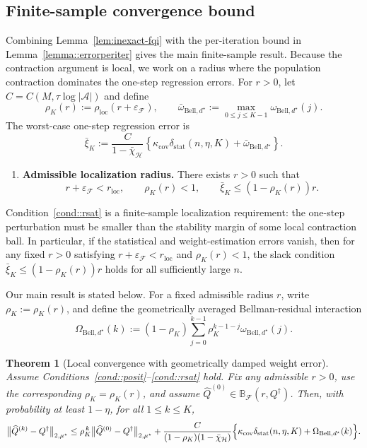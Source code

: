 \documentclass{article}
\theoremstyle{plain}
\newtheorem{theorem}{Theorem}
\theoremstyle{definition}
\theoremstyle{remark}
\begin{document}
\subsection{Finite-sample convergence bound}
\label{subsec:finite-sample-main}

Combining Lemma~\ref{lem:inexact-fqi} with the per-iteration bound in
Lemma~\ref{lemma::errorperiter} gives the main finite-sample result. Because
the contraction argument is local, we work on a radius where the population
contraction dominates the one-step regression errors. For \(r>0\), let
\(C=C(M,\tau\log|\mathcal A|)\) and define
\[
\rho_K(r)
:=
\rho_{\mathrm{loc}}(r+\varepsilon_{\mathcal F}),
\qquad
\bar\omega_{\mathrm{Bell},d^\star}
:=
\max_{0\le j\le K-1}\omega_{\mathrm{Bell},d^\star}(j).
\]
The worst-case one-step regression error is
\[
\bar\xi_K
:=
\frac{C}{1-\bar\chi_{\mathcal H}}
\left\{
\kappa_{\mathrm{cov}}\delta_{\mathrm{stat}}(n,\eta,K)
+
\bar\omega_{\mathrm{Bell},d^\star}
\right\}.
\]

\begin{enumerate}[label=\textbf{C\arabic*)}, ref={C\arabic*}, leftmargin=1.5em, resume=cond]
\item \label{cond::rsat}
\textbf{Admissible localization radius.}
There exists \(r>0\) such that
\[
r+\varepsilon_{\mathcal F}<r_{\mathrm{loc}},
\qquad
\rho_K(r)<1,
\qquad
\bar\xi_K \le (1-\rho_K(r))r.
\]
\end{enumerate}
Condition~\ref{cond::rsat} is a finite-sample localization requirement: the
one-step perturbation must be smaller than the stability margin of some local
contraction ball. In particular, if the statistical and weight-estimation
errors vanish, then for any fixed \(r>0\) satisfying
\(r+\varepsilon_{\mathcal F}<r_{\mathrm{loc}}\) and \(\rho_K(r)<1\), the slack
condition \(\bar\xi_K \le (1-\rho_K(r))r\) holds for all sufficiently large \(n\).

Our main result is stated below. For a fixed admissible radius \(r\), write
\(\rho_K:=\rho_K(r)\), and define the geometrically averaged Bellman-residual
interaction
\[
\Omega_{\mathrm{Bell},d^\star}(k)
:=
(1-\rho_K)
\sum_{j=0}^{k-1}
\rho_K^{k-1-j}
\omega_{\mathrm{Bell},d^\star}(j).
\]

\begin{theorem}[Local convergence with geometrically damped weight error]
\label{thm:convergencemain}
Assume Conditions~\ref{cond::posit}--\ref{cond::rsat} hold. Fix any admissible
\(r>0\), use the corresponding \(\rho_K=\rho_K(r)\), and assume
\(\widehat Q^{(0)} \in \mathbb B_{\mathcal F}(r,Q^\dagger)\).
Then, with probability at least
\(1-\eta\), for all \(1 \le k \le K\),
\[
\bigl\|\widehat Q^{(k)} - Q^\dagger\bigr\|_{2,\mu^\star}
\le
\rho_K^{\,k}
\bigl\|\widehat Q^{(0)} - Q^\dagger\bigr\|_{2,\mu^\star}
+
\frac{C}{(1-\rho_K)(1-\bar\chi_{\mathcal H})}
\Bigl\{
\kappa_{\mathrm{cov}}\delta_{\mathrm{stat}}(n,\eta,K)
+\Omega_{\mathrm{Bell},d^\star}(k)
\Bigr\}.
\]
\end{theorem}
\end{document}
